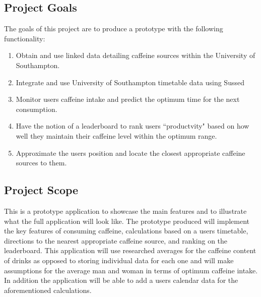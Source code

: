 \subsection{Project Goals}
The goals of this project are to produce a prototype with the following functionality: 

\begin{enumerate}
	\item{Obtain and use linked data detailing caffeine sources within the University of Southampton.}
	\item{Integrate and use University of Southampton timetable data using Sussed}
	\item{Monitor users caffeine intake and predict the optimum time for the next consumption.}
	\item{Have the notion of a leaderboard to rank users ``productvity" based on how well they maintain their caffeine level within the optimum range.}
	\item{Approximate the users position and locate the closest appropriate caffeine sources to them.}
\end{enumerate}

\subsection{Project Scope}
This is a prototype application to showcase the main features and to illustrate what the full application will look like. 
The prototype produced will implement the key features of consuming caffeine, calculations based on a users timetable, directions to the nearest appropriate caffeine source, and ranking on the leaderboard. 
This application will use researched averages for the caffeine content of drinks as opposed to storing individual data for each one and will make assumptions for the average man and woman in terms of optimum caffeine intake. 
In addition the application will be able to add a users calendar data for the aforementioned calculations. 

